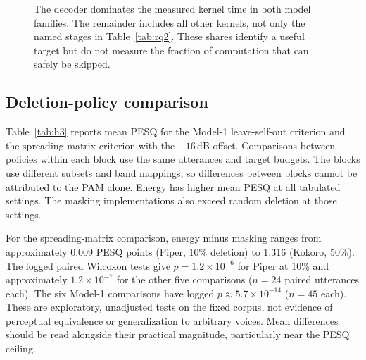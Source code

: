 \documentclass[11pt,a4paper]{article}
\begin{document}
\begin{figure}[tbp]
\centering
{}

\caption{The decoder dominates the measured kernel time in both model families. The remainder includes all other kernels, not only the named stages in Table~\ref{tab:rq2}. These shares identify a useful target but do not measure the fraction of computation that can safely be skipped.}
\label{fig:cost}
\end{figure}


\subsection{Deletion-policy comparison}
\label{sec:h3}
Table~\ref{tab:h3} reports mean PESQ for the Model-1 leave-self-out criterion and the spreading-matrix criterion with the $-16$\,dB offset. Comparisons between policies within each block use the same utterances and target budgets. The blocks use different subsets and band mappings, so differences between blocks cannot be attributed to the PAM alone. Energy has higher mean PESQ at all tabulated settings. The masking implementations also exceed random deletion at those settings.

For the spreading-matrix comparison, energy minus masking ranges from approximately 0.009 PESQ points (Piper, 10\% deletion) to 1.316 (Kokoro, 50\%). The logged paired Wilcoxon tests give $p=1.2\times10^{-6}$ for Piper at 10\% and approximately $1.2\times10^{-7}$ for the other five comparisons ($n=24$ paired utterances each). The six Model-1 comparisons have logged $p\approx5.7\times10^{-14}$ ($n=45$ each). These are exploratory, unadjusted tests on the fixed corpus, not evidence of perceptual equivalence or generalization to arbitrary voices. Mean differences should be read alongside their practical magnitude, particularly near the PESQ ceiling.
\end{document}
